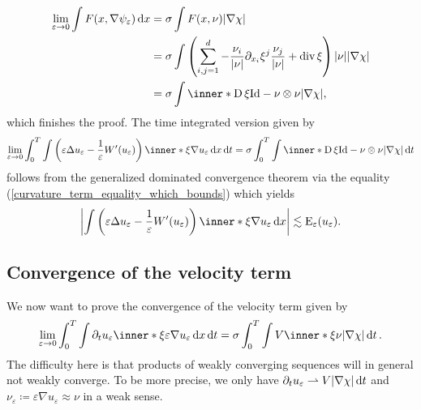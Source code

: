 \begin{align*}
	\lim_{ \varepsilon \to 0 }
	\int
	F ( x, \nabla \psi_{ \varepsilon } )
	\dd{ x }
	& =
	\sigma
	\int
	F ( x , \nu )
	\abs{ \nabla \chi }
	\\
	& = 
	\sigma
	\int
	\left(
	\sum_{ i, j = 1}^{ d }
	-
	\frac{ \nu_{ i } }{ \abs{ \nu } }
	\partial_{ x_{ i } } \xi^{ j }
	\frac{ \nu_{ j } }{ \abs{ \nu } }
	+
	\divg \xi 
	\right)
	\abs{ \nu }
	\abs{ \nabla \chi }
	\\
	& =
	\sigma
	\int
	\inner*{ \diff \xi }{ \mathrm{Id} - \nu \otimes \nu }
	\abs{ \nabla \chi },
\end{align*}
which finishes the proof.
The time integrated version given by
\begin{equation*}
	\lim_{ \varepsilon \to 0 }
	\int_{ 0 }^{ T }
	\int
	\left(
	\varepsilon \Delta u_{ \varepsilon }
	- 
	\frac{ 1 }{ \varepsilon }
	W'( u_{ \varepsilon } )
	\right)
	\inner*{ \xi }{ \nabla u_{ \varepsilon } }
	\dd{ x }
	\dd{ t }
	=
	\sigma
	\int_{ 0 }^{ T }
	\int
	\inner*{ \diff \xi }{ \mathrm{Id} - \nu \otimes \nu }
	\abs{ \nabla \chi }
	\dd{ t }
\end{equation*} 
follows from the generalized dominated convergence theorem via the equality (\ref{curvature_term_equality_which_bounds}) which yields
\begin{equation*}
	\abs{
		\int
		\left(
		\varepsilon \Delta u_{ \varepsilon } 
		-
		\frac{ 1 }{ \varepsilon }
		W'( u_{ \varepsilon } )
		\right)
		\inner*{ \xi } { \nabla u_{ \varepsilon } }
		\dd{ x }
	}
	\lesssim
	\energy_{ \varepsilon } ( u_{ \varepsilon } ).
\end{equation*}


\subsection{Convergence of the velocity term}

We now want to prove the convergence of the velocity term given by
\begin{equation*}
	\lim_{ \varepsilon \to 0 }
	\int_{ 0 }^{ T }
	\int
	\partial_{ t } u_{ \varepsilon }
	\inner*{ \xi }{ \varepsilon \nabla u_{ \varepsilon } }
	\dd{ x }
	\dd{ t }
	=
	\sigma
	\int_{ 0 }^{ T }
	\int
	V \inner*{ \xi }{ \nu }
	\abs{ \nabla \chi }
	\dd{ t }.
\end{equation*}
The difficulty here is that products of weakly converging sequences will in general not weakly converge. To be more precise, we only have $ \partial_{ t } u_{ \varepsilon } \rightharpoonup V \abs{ \nabla \chi } \dd{ t } $ and $ \nu_{ \varepsilon } \coloneqq \varepsilon \nabla u_{ \varepsilon } \approx \nu $ in a weak sense. 

